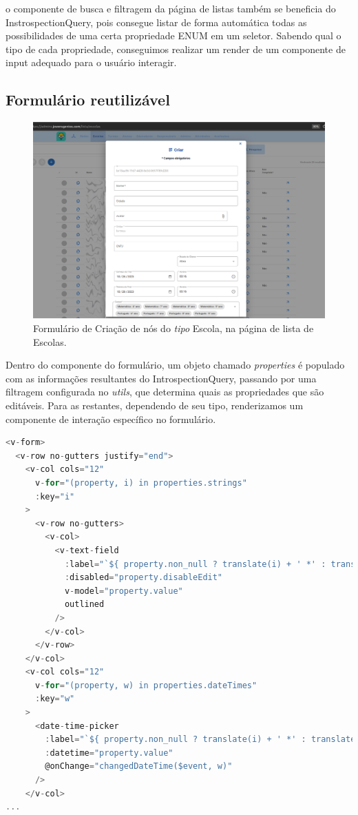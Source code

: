 o componente de busca e filtragem da página de listas também se beneficia do InstrospectionQuery, pois consegue listar de forma automática todas as possibilidades de uma certa propriedade ENUM em um seletor. Sabendo qual o tipo de cada propriedade, conseguimos realizar um render de um componente de input adequado para o usuário interagir.

\subsection{Formulário reutilizável}


\begin{figure}
    \centering
    \includegraphics[width=1\linewidth]{Imagens/chap04/front-reusable-form.png}
    \caption{Formulário de Criação de nós do \textit{tipo} Escola, na página de lista de Escolas.}
    \label{fig:front-reusable-form}
\end{figure}


Dentro do componente do formulário, um objeto chamado \textit{properties} é populado com as informações resultantes do IntrospectionQuery, passando por uma filtragem configurada no \textit{utils}, que determina quais as propriedades que são editáveis.
Para as restantes, dependendo de seu tipo, renderizamos um componente de interação específico no formulário.

\begin{lstlisting}[language=javascript]
<v-form>
  <v-row no-gutters justify="end">
    <v-col cols="12"
      v-for="(property, i) in properties.strings"
      :key="i"
    >
      <v-row no-gutters>
        <v-col>
          <v-text-field
            :label="`${ property.non_null ? translate(i) + ' *' : translate(i)}`"
            :disabled="property.disableEdit"
            v-model="property.value"
            outlined
          />
        </v-col>
      </v-row>
    </v-col>
    <v-col cols="12"
      v-for="(property, w) in properties.dateTimes"
      :key="w"
    >
      <date-time-picker
        :label="`${ property.non_null ? translate(i) + ' *' : translate(i)}`"
        :datetime="property.value"
        @onChange="changedDateTime($event, w)"
      />
    </v-col>
...


\end{lstlisting}

